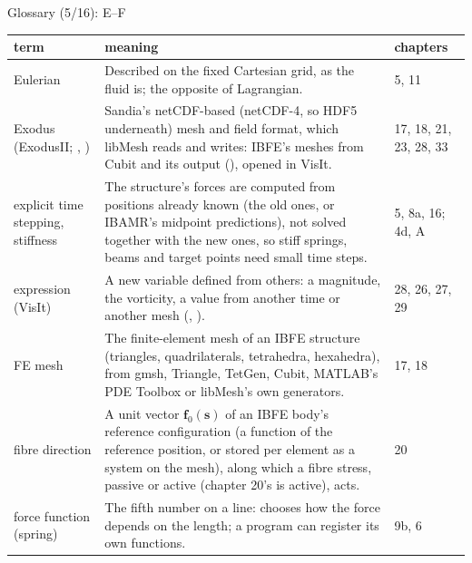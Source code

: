 \documentclass[aspectratio=169,11pt]{beamer}
\makeatletter
\newenvironment{glossarytable}{\scriptsize\renewcommand{\arraystretch}{1.08}%
  \begin{tabular}{@{}L{0.19\textwidth}L{0.63\textwidth}L{0.12\textwidth}@{}}\toprule
  term & meaning & chapters\\\midrule}{\bottomrule\end{tabular}}
\makeatother
\begin{document}
\begin{frame}{Glossary (5/16): E--F}
\label{fr:g5}
\begin{glossarytable}
Eulerian & Described on the fixed Cartesian grid, as the fluid is; the opposite of Lagrangian. & 5, 11\\
Exodus (ExodusII; , ) & Sandia's netCDF-based (netCDF-4, so HDF5 underneath) mesh and field format, which libMesh reads and writes: IBFE's meshes from Cubit and its output (), opened in VisIt. & 17, 18, 21, 23, 28, 33\\
explicit time stepping, stiffness & The structure's forces are computed from positions already known (the old ones, or IBAMR's midpoint predictions), not solved together with the new ones, so stiff springs, beams and target points need small time steps. & 5, 8a, 16; 4d, A\\
expression (VisIt) & A new variable defined from others: a magnitude, the vorticity, a value from another time or another mesh (, ). & 28, 26, 27, 29\\
FE mesh & The finite-element mesh of an IBFE structure (triangles, quadrilaterals, tetrahedra, hexahedra), from gmsh, Triangle, TetGen, Cubit, MATLAB's PDE Toolbox or libMesh's own generators. & 17, 18\\
fibre direction & A unit vector $\mathbf{f}_0(\mathbf{s})$ of an IBFE body's reference configuration (a function of the reference position, or stored per element as a system on the mesh), along which a fibre stress, passive or active (chapter 20's is active), acts. & 20\\
force function (spring) & The fifth number on a  line: chooses how the force depends on the length; a program can register its own functions. & 9b, 6\\
\end{glossarytable}
\end{frame}
\end{document}

